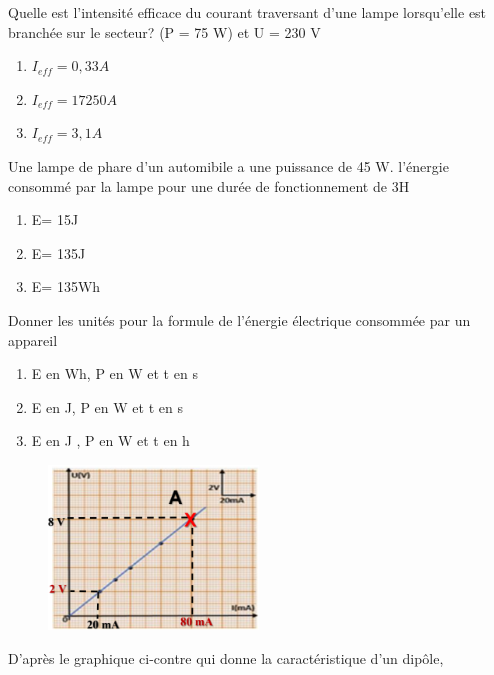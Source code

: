 \documentclass[12pt]{article}
\begin{document}
\begin{multicols}{2}
\begin{enumerate}
	\item Quelle est l'intensité efficace du courant traversant
d'une lampe lorsqu'elle est branchée sur le
secteur? (P = 75 W) et U = 230 V 
\begin{enumerate}
	\item $I_{eff} = 0,33A$
	\item $I_{eff} = 17250A$
	\item $I_{eff} = 3,1A$
\end{enumerate}
\item Une lampe de phare d'un automibile a une puissance de 45 W. l'énergie consommé par la lampe pour une durée de fonctionnement
de 3H
\begin{enumerate}
	\item E= 15J
	\item E= 135J
	\item E= 135Wh
\end{enumerate}
\item Donner les unités pour la formule de l'énergie
électrique consommée par un appareil 
\begin{enumerate}
	\item  E en Wh, P en W et t en s
	\item E en J, P en W et t en s 
	\item  E en J , P en W et t en h
\end{enumerate}

\begin{minipage}{\linewidth} 
\begin{figure} 
\vspace{-1cm} 
\includegraphics[width=2.2in]{./img/Resistance.png}
\end{figure} 


\item D’après le graphique ci-contre qui donne la caractéristique d’un dipôle,
\end{minipage}
\begin{enumerate}
	\vspace{0.5cm}


\end{enumerate}
\end{enumerate}
\end{multicols}
\end{document}

